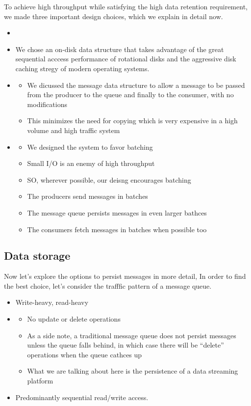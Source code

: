 \documentclass{report}
\theoremstyle{definition}
\let\oldsubsection\subsection
\renewcommand{\subsection}{\oldsubsection*}
\begin{document}
To achieve high throughput while satisfying the high data retention requirement, we made three important design choices, which we explain in detail now.

\begin{itemize}
\item

\item
We chose an on-disk data structure that takes advantage of the great sequential acccess performance of rotational disks and the aggressive disk caching stregy of modern operating systems.
\item
\begin{itemize}
\item
We dicussed the message data structure to allow a message to be passed from the producer to the queue and finally to the consumer, with no modifications
\item
This minimizes the need for copying which is very expensive in a high volume and high traffic system
\end{itemize}

\item

\begin{itemize}
\item
We designed the system to favor batching
\item
Small I/O is an enemy of high throughput
\item
SO, wherever possible, our deisng encourages batching
\item
The producers send messages in batches
\item
The message queue persists messages in even larger bathces
\item
The consumers fetch messages in batches when possible too
\end{itemize}
\end{itemize}

\subsection{Data storage}

Now let's explore the options to persist messages in more detail, In order to find the best choice, let's consider the trafffic pattern of a message queue.

\begin{itemize}
\item
Write-heavy, read-heavy
\item
\begin{itemize}
\item
No update or delete operations
\item
As a side note, a traditional message queue does not persist messages unless the queue falls behind, in which case there will be ``delete'' operations when the queue cathces up
\item
What we are talking about here is the persistence of a data streaming platform
\end{itemize}
\item
Predominantly sequential read/write access.
\end{itemize}
\end{document}
